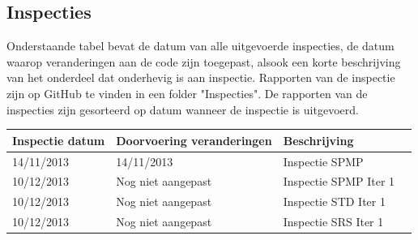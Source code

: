 \subsection{Inspecties}
Onderstaande tabel bevat de datum van alle uitgevoerde inspecties, de datum waarop veranderingen aan de code zijn toegepast, alsook een korte beschrijving van het onderdeel dat onderhevig is aan inspectie. Rapporten van de inspectie zijn op GitHub\cite{GitHubRepository} te vinden in een folder "Inspecties". De rapporten van de inspecties zijn gesorteerd op datum wanneer de inspectie is uitgevoerd.

\begin{center}
    \begin{tabular}{| l | l | l | l |}
    \hline
    Inspectie datum & Doorvoering veranderingen & Beschrijving \\ \hline
    14/11/2013 & 14/11/2013 & Inspectie SPMP \\ \hline
    10/12/2013 & Nog niet aangepast & Inspectie SPMP Iter 1 \\ \hline
    10/12/2013 & Nog niet aangepast & Inspectie STD Iter 1 \\ \hline
    10/12/2013 & Nog niet aangepast & Inspectie SRS Iter 1 \\ \hline
    
    \end{tabular}
\end{center}


